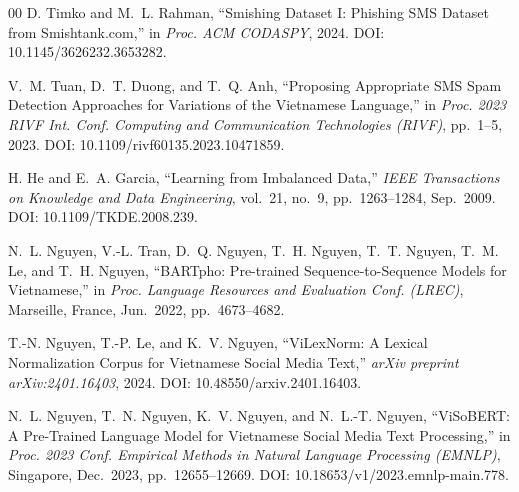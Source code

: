 \documentclass[conference]{IEEEtran}
\begin{document}
\begin{thebibliography}{00}
D. Timko and M.~L. Rahman,
``Smishing Dataset I: Phishing SMS Dataset from Smishtank.com,''
in \textit{Proc. ACM CODASPY}, 2024.
DOI: 10.1145/3626232.3653282.

V.~M. Tuan, D.~T. Duong, and T.~Q. Anh,
``Proposing Appropriate SMS Spam Detection Approaches for Variations of
the Vietnamese Language,''
in \textit{Proc. 2023 RIVF Int. Conf. Computing and Communication
Technologies (RIVF)}, pp.~1--5, 2023.
DOI: 10.1109/rivf60135.2023.10471859.

H. He and E.~A. Garcia,
``Learning from Imbalanced Data,''
\textit{IEEE Transactions on Knowledge and Data Engineering},
vol.~21, no.~9, pp.~1263--1284, Sep.\ 2009.
DOI: 10.1109/TKDE.2008.239.

N.~L. Nguyen, V.-L. Tran, D.~Q. Nguyen, T.~H. Nguyen, T.~T. Nguyen,
T.~M. Le, and T.~H. Nguyen,
``BARTpho: Pre-trained Sequence-to-Sequence Models for Vietnamese,''
in \textit{Proc. Language Resources and Evaluation Conf. (LREC)},
Marseille, France, Jun.\ 2022, pp.~4673--4682.

T.-N. Nguyen, T.-P. Le, and K.~V. Nguyen,
``ViLexNorm: A Lexical Normalization Corpus for Vietnamese Social Media
Text,''
\textit{arXiv preprint arXiv:2401.16403}, 2024.
DOI: 10.48550/arxiv.2401.16403.

N.~L. Nguyen, T.~N. Nguyen, K.~V. Nguyen, and N.~L.-T. Nguyen,
``ViSoBERT: A Pre-Trained Language Model for Vietnamese Social Media
Text Processing,''
in \textit{Proc. 2023 Conf. Empirical Methods in Natural Language
Processing (EMNLP)}, Singapore, Dec.\ 2023, pp.~12655--12669.
DOI: 10.18653/v1/2023.emnlp-main.778.


\end{thebibliography}
\end{document}
